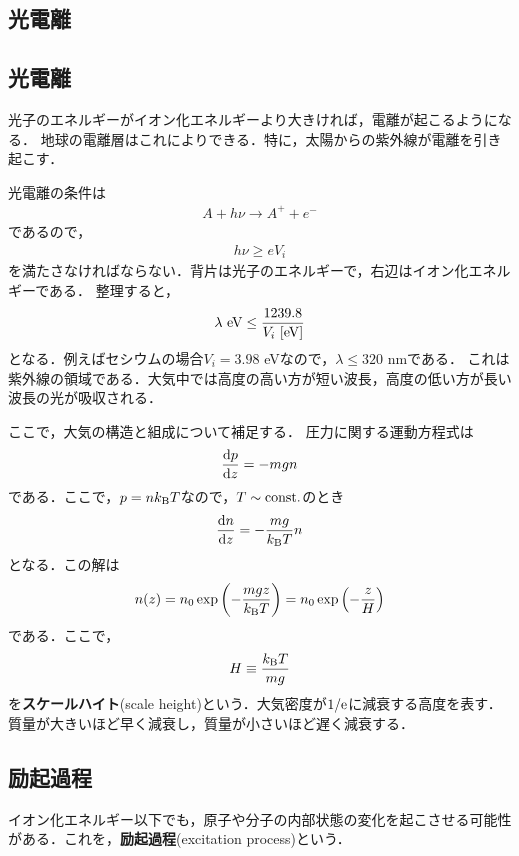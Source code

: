 \documentclass{report}
\begin{document}
    \subsection{光電離}
    \subsection{光電離}
      光子のエネルギーがイオン化エネルギーより大きければ，電離が起こるようになる．
      地球の電離層はこれによりできる．特に，太陽からの紫外線が電離を引き起こす．

      光電離の条件は
      \begin{align}
        A + h\nu \rightarrow A^+ + e^-
      \end{align}
      であるので，
      \begin{align}
        h\nu \geq e V_i
      \end{align}
      を満たさなければならない．背片は光子のエネルギーで，右辺はイオン化エネルギーである．
      整理すると，
      \begin{align}
        \lambda\ \mathrm{eV} \leq \frac{1239.8}{V_i\ [\mathrm{eV}]}
      \end{align}
      となる．例えばセシウムの場合$V_i = 3.98$ eVなので，$\lambda \leq 320$ nmである．
      これは紫外線の領域である．大気中では高度の高い方が短い波長，高度の低い方が長い波長の光が吸収される．

      ここで，大気の構造と組成について補足する．
      圧力に関する運動方程式は
      \begin{align}
        \dv{p}{z} = -mgn
      \end{align}
      である．ここで，$p=nk_{\mathrm{B}} T$なので，$T \sim \mathrm{const.}$のとき
      \begin{align}
        \dv{n}{z} = - \frac{mg}{k_{\mathrm{B}} T}n
      \end{align}
      となる．この解は
      \begin{align}
        n(z) = n_0 \exp\qty(-\frac{mgz}{k_{\mathrm{B}} T}) = n_0 \exp\qty(-\frac{z}{H})
      \end{align}
      である．ここで，
      \begin{align}
        H \equiv \frac{k_{\mathrm{B}} T}{mg}
      \end{align}
      を\textbf{スケールハイト}(scale height)という．大気密度が$1/\mathrm{e}$に減衰する高度を表す．
      質量が大きいほど早く減衰し，質量が小さいほど遅く減衰する．

    \subsection{励起過程}
      イオン化エネルギー以下でも，原子や分子の内部状態の変化を起こさせる可能性がある．これを，\textbf{励起過程}(excitation process)という．
\end{document}
